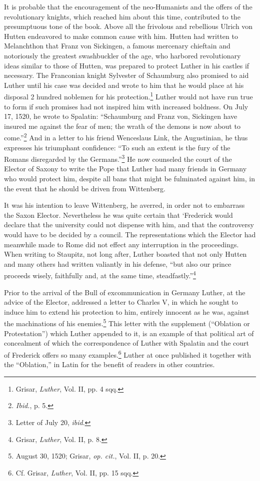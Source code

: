 It is probable that the encouragement of the neo-Humanists and
the offers of the revolutionary knights, which reached him about this
time, contributed to the presumptuous tone of the book. Above
all the frivolous and rebellious Ulrich von Hutten endeavored to
make common cause with him. Hutten had written to Melanchthon
that Franz von Sickingen, a famous mercenary chieftain and notoriously
the greatest swashbuckler of the age, who harbored revolutionary
ideas similar to those of Hutten, was prepared to protect
Luther in his castles if necessary. The Franconian knight Sylvester of
Schaumburg also promised to aid Luther until his case was decided
and wrote to him that he would place at his disposal 2 hundred
noblemen for his protection.\footnote{Grisar, \textit{Luther}, Vol. II, pp. 4 sqq.}
Luther would not have run true to
form if such promises had not inspired him with increased boldness.
On July 17, 1520, he wrote to Spalatin: “Schaumburg and Franz
von, Sickingen have insured me against the fear of men; the wrath of
the demons is now about to come.”\footnote{\textit{Ibid.}, p. 5.}
And in a letter to his friend
Wenceslaus Link, the Augustinian, he thus expresses his triumphant
confidence: “To such an extent is the fury of the Romans disregarded by
the Germans.”\footnote{Letter of July 20, \textit{ibid}.}
He now counseled the court of the Elector
of Saxony to write the Pope that Luther had many friends in
Germany who would protect him, despite all bans that might be fulminated
against him, in the event that he should be driven from Wittenberg.

It was his intention to leave Wittenberg, he averred, in order not
to embarrass the Saxon Elector. Nevertheless he was quite certain
that ‘Frederick would declare that the university could not dispense with
him, and that the controversy would have to be decided
by a council. The representations which the Elector had meanwhile
made to Rome did not effect any interruption in the proceedings.
When writing to Staupitz, not long after, Luther boasted that not
only Hutten and many others had written valiantly in his defense,
“but also our prince proceeds wisely, faithfully and, at the same time,
steadfastly.”\footnote{Grisar, \textit{Luther}, Vol. II, p. 8.}

Prior to the arrival of the Bull of excommunication in Germany
Luther, at the advice of the Elector, addressed a letter to Charles V,
in which he sought to induce him to extend his protection to him,
entirely innocent as he was, against the machinations of his enemies.\footnote
{August 30, 1520; Grisar, \textit{op. cit.}, Vol. II, p. 20.}
This letter with the supplement (“Oblation or Protestation”) which
Luther appended to it, is an example of that political art of concealment
of which the correspondence of Luther with Spalatin and the
court of Frederick offers so many examples.\footnote
{Cf. Grisar, \textit{Luther}, Vol. II, pp. 15 sqq.}
Luther at once published
it together with the “Oblation,” in Latin for the benefit of
readers in other countries.


